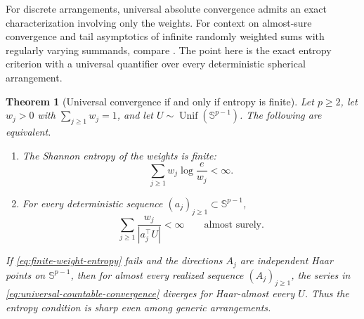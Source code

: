 \documentclass[11pt]{article}
\numberwithin{equation}{section}
\theoremstyle{thmstyleone}%
\newtheorem{theorem}{Theorem}[section]
\theoremstyle{thmstyletwo}%
\let\cref\autoref
\newcommand{\sphere}{\mathbb S}
\newcommand{\Unif}{\operatorname{Unif}}
\begin{document}
For discrete arrangements, universal absolute convergence admits an exact
characterization involving only the weights.  For context on almost-sure
convergence and tail asymptotics of infinite randomly weighted sums with
regularly varying summands, compare \cite{hazra-maulik-2012}.  The point
here is the exact entropy criterion with a universal quantifier over every
deterministic spherical arrangement.

\begin{theorem}[Universal convergence if and only if entropy is finite]
\label{thm:entropy-threshold}
Let \(p\geq2\), let \(w_j>0\) with \(\sum_{j\geq1}w_j=1\), and let
\(U\sim\Unif(\sphere^{p-1})\).  The following are equivalent.
\begin{enumerate}[label=\textup{(\roman*)}]
\item The Shannon entropy of the weights is finite:
  \begin{equation}
    \sum_{j\geq1}w_j\log\frac{e}{w_j}<\infty.
    \label{eq:finite-weight-entropy}
  \end{equation}
\item For every deterministic sequence
  \((a_j)_{j\geq1}\subset\sphere^{p-1}\),
  \begin{equation}
    \sum_{j\geq1}\frac{w_j}{|a_j^\top U|}<\infty
    \qquad\text{almost surely}.
    \label{eq:universal-countable-convergence}
  \end{equation}
\end{enumerate}
If \cref{eq:finite-weight-entropy} fails and the directions \(A_j\) are
independent Haar points on \(\sphere^{p-1}\), then for almost every realized
sequence \((A_j)_{j\geq1}\), the series in
\cref{eq:universal-countable-convergence} diverges for Haar-almost every
\(U\).  Thus the entropy condition is sharp even among generic arrangements.
\end{theorem}
\end{document}
